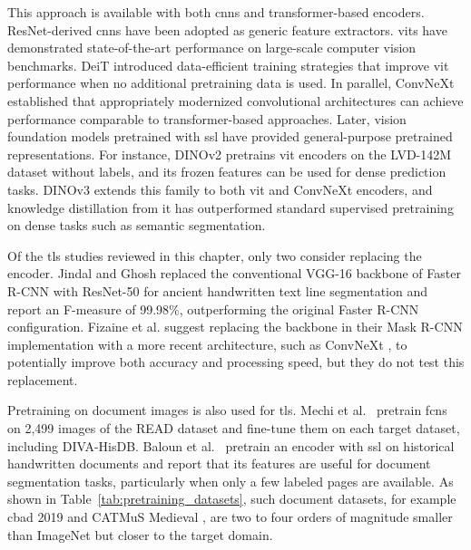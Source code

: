 This approach is available with both \glspl{cnn} and transformer-based encoders. ResNet-derived \glspl{cnn} \cite{He_2016_CVPR} have been adopted as generic feature extractors. \Glspl{vit} \cite{dosovitskiy2021imageworth16x16words} have demonstrated state-of-the-art performance on large-scale computer vision benchmarks. DeiT \cite{touvron2021trainingdataefficientimagetransformers} introduced data-efficient training strategies that improve \gls{vit} performance when no additional pretraining data is used. In parallel, ConvNeXt \cite{liu2022convnet2020s} established that appropriately modernized convolutional architectures can achieve performance comparable to transformer-based approaches. Later, vision foundation models pretrained with \gls{ssl} have provided general-purpose pretrained representations. For instance, DINOv2 \cite{oquab2024dinov2learningrobustvisual} pretrains \gls{vit} encoders on the LVD-142M dataset without labels, and its frozen features can be used for dense prediction tasks. DINOv3 \cite{dinov3} extends this family to both \gls{vit} and ConvNeXt encoders, and knowledge distillation from it has outperformed standard supervised pretraining on dense tasks such as semantic segmentation.

Of the \gls{tls} studies reviewed in this chapter, only two consider replacing the encoder. Jindal and Ghosh \cite{jindal2023fasterrcnn} replaced the conventional VGG-16 backbone of Faster R-CNN with ResNet-50 for ancient handwritten text line segmentation and report an F-measure of 99.98\%, outperforming the original Faster R-CNN configuration. Fizaine et al. \cite{fizaine} suggest replacing the backbone in their Mask R-CNN implementation with a more recent architecture, such as ConvNeXt \cite{liu2022convnet2020s}, to potentially improve both accuracy and processing speed, but they do not test this replacement.

Pretraining on document images is also used for \gls{tls}. Mechi et al.~\cite{mechi2021twostep} pretrain \glspl{fcn} on 2,499 images of the READ dataset and fine-tune them on each target dataset, including DIVA-HisDB. Baloun et al.~\cite{baloun2025ssl} pretrain an encoder with \gls{ssl} on historical handwritten documents and report that its features are useful for document segmentation tasks, particularly when only a few labeled pages are available. As shown in Table~\ref{tab:pretraining_datasets}, such document datasets, for example \gls{cbad} 2019 \cite{cbad-2019} and CATMuS Medieval \cite{catmus-medieval}, are two to four orders of magnitude smaller than ImageNet \cite{deng2009imagenet} but closer to the target domain.

